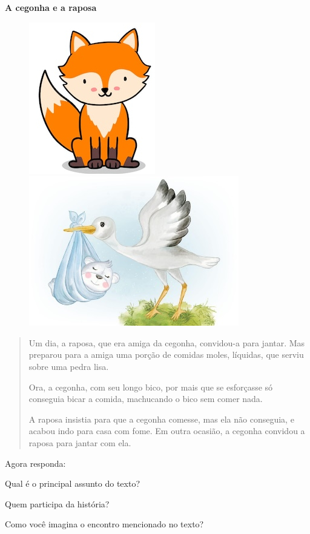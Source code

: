 \textbf{A cegonha e a raposa}

\begin{figure}[htpb!]
\centering
\includegraphics[width=.2\textwidth]{media/image121.jpeg}
\includegraphics[width=.4\textwidth]{media/image122.jpeg}
\end{figure}

\begin{quote}
Um dia, a raposa, que era amiga da cegonha, convidou-a para jantar. Mas
preparou para a amiga uma porção de comidas moles, líquidas, que serviu
sobre uma pedra lisa.

Ora, a cegonha, com seu longo bico, por mais que se esforçasse só
conseguia bicar a comida, machucando o bico sem comer nada.

A raposa insistia para que a cegonha comesse, mas ela não conseguia, e
acabou indo para casa com fome. Em outra ocasião, a cegonha convidou a
raposa para jantar com ela.

\end{quote}

Agora responda:

\begin{escolha}
\item Qual é o principal assunto do texto?


\item Quem participa da história?


\item Como você imagina o encontro mencionado no texto? %

\end{escolha}

